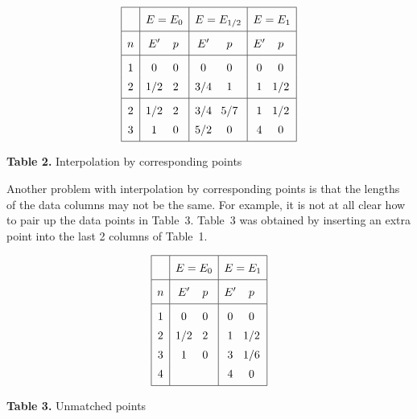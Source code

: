 \documentclass[11pt]{article}
\begin{document}
\begin{table}
$$
\vbox{
  \offinterlineskip
  \hrule
                                 \tabskip=0pt
  \halign{    %
    \vrule height 14pt depth 3pt #      \tabskip=5pt &
    \hfil #\hfil&                       %
    \vrule #&
    \hfil$#$\hfil  &               %
    \hfil$#$\hfil  &               %
    \vrule #&
    \hfil$#$\hfil  &               %
    \hfil$#$\hfil  &               %
    \vrule #&
    \hfil$#$\hfil  &               %
    \hfil$#$\hfil  &               %
    \vrule #              \tabskip=0pt  \cr  %
   depth 7pt &&& \multispan{2}\hfil$E = E_0$\hfil&&
        \multispan{2}\hfil$E = E_{1/2}$\hfil&&
        \multispan{2}\hfil$E = E_1$\hfil&\cr
   \noalign{\hrule}
  depth 7pt & $n$&&  E'& p &&  E' & p && E' & p & \cr
   \noalign{\hrule}
    & 1&& 0 & 0&&  0 & 0&& 0 & 0& \cr  %
 depth 7pt    & 2&& 1/2 & 2&&  3/4 & 1&& 1 & 1/2& \cr  %
   \noalign{\hrule}
    & 2&& 1/2 & 2&&  3/4 & 5/7&& 1 & 1/2& \cr  %
 depth 7pt   & 3&& 1 & 0&&  5/2 & 0&& 4 & 0& \cr  %
   \noalign{\hrule}
  }
}
$$
\vglue 10pt
\centerline{{\bf Table 2.}  Interpolation by corresponding points}
\end{table}

Another problem with interpolation by corresponding points
is that the lengths of the data columns may not be the same.
For example, it is not at all clear how to pair up the data
points in Table~3.  Table~3 was obtained by inserting an extra
point into the last 2 columns of Table~1.

\begin{table}
$$
\vbox{
  \offinterlineskip
  \hrule
                                 \tabskip=0pt
  \halign{    %
    \vrule height 14pt depth 3pt #      \tabskip=5pt &
    \hfil #\hfil&                       %
    \vrule #&
    \hfil$#$\hfil  &               %
    \hfil$#$\hfil  &               %
    \vrule #&
    \hfil$#$\hfil  &               %
    \hfil$#$\hfil  &               %
    \vrule #              \tabskip=0pt  \cr  %
   depth 7pt &&& \multispan{2}\hfil$E = E_0$\hfil&&
        \multispan{2}\hfil$E = E_1$\hfil&\cr
   \noalign{\hrule}
   depth 7pt & $n$&&  E'& p &&  E'&  p & \cr
   \noalign{\hrule}
    & 1&& 0 & 0&& 0 & 0& \cr  %
    & 2&& 1/2 & 2&& 1 & 1/2& \cr %
    & 3&& 1 & 0&& 3 & 1/6& \cr %
 depth 7pt   & 4&&  & && 4 & 0& \cr %
   \noalign{\hrule}
  }
}
$$
\vglue 10pt
\centerline{{\bf Table 3.}  Unmatched points}
\end{table}
\end{document}
